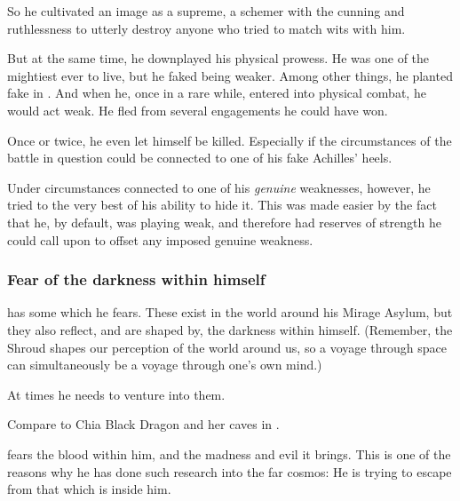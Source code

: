 So he cultivated an image as a  supreme, a schemer with the cunning and ruthlessness to utterly destroy anyone who tried to match wits with him. 

But at the same time, he downplayed his physical prowess. 
He was one of the mightiest \dragons{} ever to live, but he faked being weaker. 
Among other things, he planted fake  in \emph{}. 
And when he, once in a rare while, entered into physical combat, he would act weak. 
He fled from several engagements he could have won. 

Once or twice, he even let himself be killed. 
Especially if the circumstances of the battle in question could be connected to one of his fake Achilles' heels. 

Under circumstances connected to one of his \emph{genuine} weaknesses, however, he tried to the very best of his ability to hide it.
This was made easier by the fact that he, by default, was playing weak, and therefore had reserves of strength he could call upon to offset any imposed genuine weakness. 





\subsubsection{Fear of the darkness within himself}
\Ishnaruchaefir{} has some  which he fears. 
These exist in the world around his Mirage Asylum, but they also reflect, and are shaped by, the darkness within himself. 
(Remember, the Shroud shapes our perception of the world around us, so a voyage through space can simultaneously be a voyage through one's own mind.) 

At times he needs to venture into them. 

Compare to Chia Black Dragon and her caves in \cite[p.120-150]{StephenMarley:ShadowSisters}. 

\Ishnaruchaefir{} fears the \xsic{} blood within him, and the madness and evil it brings. 
This is one of the reasons why he has done such research into the far cosmos: 
He is trying to escape from that which is inside him.






